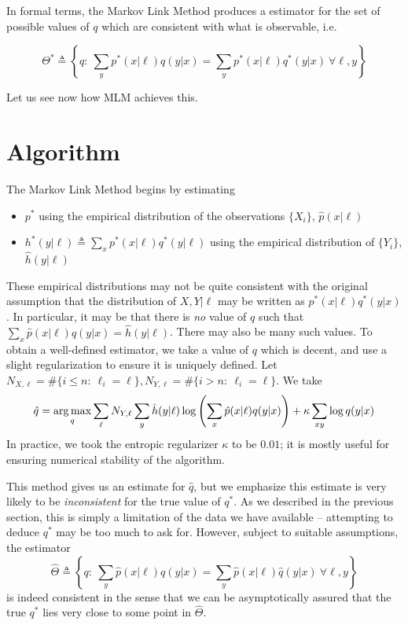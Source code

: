In formal terms, the Markov Link Method produces a estimator for the set of possible values of $q$ which are consistent with what is observable, i.e.

\begin{equation*}
\Theta^* \triangleq \left\{q:\ \sum_y p^*(x|\ell)q(y|x) = \sum_y p^*(x|\ell)q^*(y|x)\ \forall \ell,y\right\}
\end{equation*}

Let us see now how MLM achieves this.

\section{Algorithm}

The Markov Link Method begins by estimating

\begin{itemize}
\item $p^*$ using the empirical distribution of the observations $\{X_i\}$, $\hat p(x|\ell)$
\item $h^*(y|\ell)\triangleq \sum_x p^*(x|\ell)q^*(y|\ell)$ using the empirical distribution of $\{Y_i\}$, $\hat h(y|\ell)$
\end{itemize}

These empirical distributions may not be quite consistent with the original assumption that the distribution of $X,Y|\ell$ may be written as $p^*(x|\ell)q^*(y|x)$.  In particular, it may be that there is \emph{no} value of $q$ such that $\sum_x \hat p(x|\ell) q(y|x) = \hat h(y|\ell)$.  There may also be many such values.  To obtain a well-defined estimator, we take a value of $q$ which is decent, and use a slight regularization to ensure it is uniquely defined.  Let $N_{X,\ell}=\#\{i\leq n:\ \ell_i=\ell\},N_{Y,\ell}=\#\{i> n:\ \ell_i=\ell\}$.  We take
%
\begin{equation*}
\hat q = \operatorname*{arg\,max}_q \sum_\ell N_{Y,\ell}\sum_{y}\hat h(y|\ell)\log\left(\sum_{x}\hat p(x|\ell)q(y|x)\right) + \kappa \sum_{xy} \log q(y|x)
\end{equation*}
%
In practice, we took the entropic regularizer $\kappa$ to be $0.01$; it is mostly useful for ensuring numerical stability of the algorithm.  

This method gives us an estimate for $\hat q$, but we emphasize this estimate is very likely to be \emph{inconsistent} for the true value of $q^*$.  As we described in the previous section, this is simply a limitation of the data we have available -- attempting to deduce $q^*$ may be too much to ask for.  However, subject to suitable assumptions, the estimator
\begin{equation*}
\hat \Theta\triangleq \left\{q:\ \sum_y \hat p(x|\ell)q(y|x) = \sum_y \hat p(x|\ell)\hat q(y|x)\ \forall \ell,y\right\}
\end{equation*}
is indeed consistent in the sense that we can be asymptotically assured that the true $q^*$ lies very close to some point in $\hat \Theta$.

